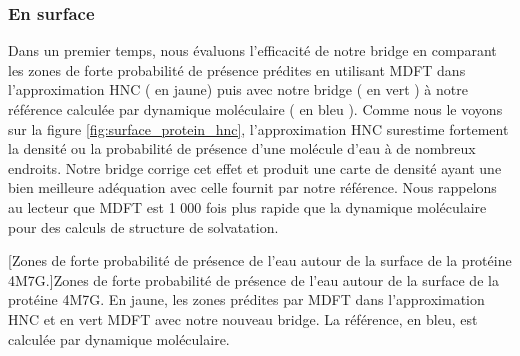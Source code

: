 \subsubsection{En surface}
Dans un premier temps, nous évaluons l'efficacité de notre bridge en comparant les zones de forte probabilité de présence prédites en utilisant MDFT dans l'approximation HNC ( en jaune) puis avec notre bridge ( en vert ) à notre référence calculée par dynamique moléculaire ( en bleu ). Comme nous le voyons sur la figure \ref{fig:surface_protein_hnc}, l'approximation HNC surestime fortement la densité ou la probabilité de présence d'une molécule d'eau à de nombreux endroits. Notre bridge corrige cet effet et produit une carte de densité ayant une bien meilleure adéquation avec celle fournit par notre référence. Nous rappelons au lecteur que MDFT est 1 000 fois plus rapide que la dynamique moléculaire pour des calculs de structure de solvatation.







\begin{center}
    \captionsetup{type=figure}
	[Zones de forte probabilité de présence de l'eau autour de la surface de la protéine 4M7G.]{Zones de forte probabilité de présence de l'eau autour de la surface de la protéine 4M7G. En jaune, les zones prédites par MDFT dans l'approximation HNC et en vert MDFT avec notre nouveau bridge. La référence, en bleu, est calculée par dynamique moléculaire. }
      \label{fig:surface_protein_hnc}
\end{center}


